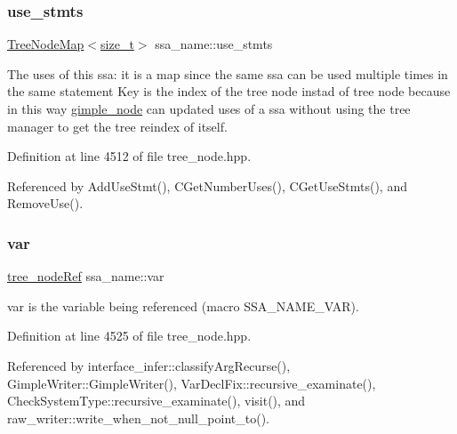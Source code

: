 \mbox{\label{structssa__name_a9af8fc723020e14134ef168fd7bfa0f8}} 
\subsubsection{\texorpdfstring{use\+\_\+stmts}{use\_stmts}}
{\footnotesize\ttfamily \hyperlink{classTreeNodeMap}{Tree\+Node\+Map}$<$\hyperlink{tutorial__fpt__2017_2intro_2sixth_2test_8c_a7c94ea6f8948649f8d181ae55911eeaf}{size\+\_\+t}$>$ ssa\+\_\+name\+::use\+\_\+stmts\hspace{0.3cm}{\ttfamily [private]}}



The uses of this ssa\+: it is a map since the same ssa can be used multiple times in the same statement Key is the index of the tree node instad of tree node because in this way \hyperlink{structgimple__node}{gimple\+\_\+node} can updated uses of a ssa without using the tree manager to get the tree reindex of itself. 



Definition at line 4512 of file tree\+\_\+node.\+hpp.



Referenced by Add\+Use\+Stmt(), C\+Get\+Number\+Uses(), C\+Get\+Use\+Stmts(), and Remove\+Use().

\mbox{\label{structssa__name_abe02043dd18cda911f44c46c0118ec38}} 
\subsubsection{\texorpdfstring{var}{var}}
{\footnotesize\ttfamily \hyperlink{tree__node_8hpp_a6ee377554d1c4871ad66a337eaa67fd5}{tree\+\_\+node\+Ref} ssa\+\_\+name\+::var}



var is the variable being referenced (macro S\+S\+A\+\_\+\+N\+A\+M\+E\+\_\+\+V\+AR). 



Definition at line 4525 of file tree\+\_\+node.\+hpp.



Referenced by interface\+\_\+infer\+::classify\+Arg\+Recurse(), Gimple\+Writer\+::\+Gimple\+Writer(), Var\+Decl\+Fix\+::recursive\+\_\+examinate(), Check\+System\+Type\+::recursive\+\_\+examinate(), visit(), and raw\+\_\+writer\+::write\+\_\+when\+\_\+not\+\_\+null\+\_\+point\+\_\+to().

